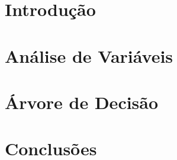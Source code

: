 \documentclass[
	12pt,				%
	openany,			%
  oneside,      %
	a4paper,			%
	english,			%
	french,				%
	spanish,			%
	brazil				%
	]{abntex2}
\begin{document}
\graphicspath{{./Gen/Img/}{../Gen/Img/}{./Img/}}

\chapter[Introdução]{Introdução}



\chapter{Análise de Variáveis}


\chapter{Árvore de Decisão}



\chapter{Conclusões}

%

\postextual



%
%

\end{document}
